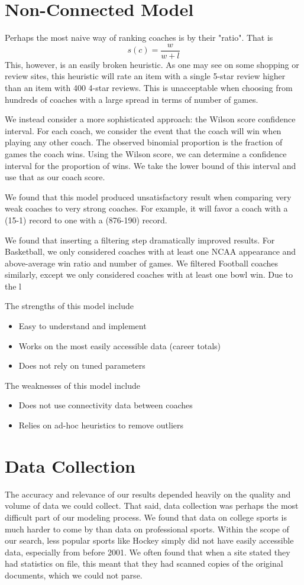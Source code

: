 \documentclass[12pt]{article}
\begin{document}
\section{Non-Connected Model}
Perhaps the most naive way of ranking coaches is by their "ratio". That is
\[s(c) = \frac{w}{w + l}\] 
This, however, is an easily broken heuristic. As one may see on some shopping or review sites, this heuristic will rate an item with a single 5-star review higher than an item with 400 4-star reviews. This is unacceptable when choosing from hundreds of coaches with a large spread in terms of number of games. 

We instead consider a more sophisticated approach: the Wilson score confidence interval. For each coach, we consider the event that the coach will win when playing any other coach. The observed binomial proportion is the fraction of games the coach wins. Using the Wilson score, we can determine a confidence interval for the proportion of wins. We take the lower bound of this interval and use that as our coach score.

We found that this model produced unsatisfactory result when comparing very weak coaches to very strong coaches. For example, it will favor a coach with a (15-1) record to one with a (876-190) record.

We found that inserting a filtering step dramatically improved results. For Basketball, we only considered coaches with at least one NCAA appearance and above-average win ratio and number of games. We filtered Football coaches similarly, except we only considered coaches with at least one bowl win. Due to the l

The strengths of this model include 
\begin{itemize}
\item Easy to understand and implement
\item Works on the most easily accessible data (career totals)
\item Does not rely on tuned parameters
\end{itemize}

The weaknesses of this model include
\begin{itemize}
\item Does not use connectivity data between coaches
\item Relies on ad-hoc heuristics to remove outliers
\end{itemize}



\section{Data Collection}
The accuracy and relevance of our results depended heavily on the quality and volume of data we could collect. That said, data collection was perhaps the most difficult part of our modeling process. We found that data on college sports is much harder to come by than data on professional sports. Within the scope of our search, less popular sports like Hockey simply did not have easily accessible data, especially from before 2001. We often found that when a site stated they had statistics on file, this meant that they had scanned copies of the original documents, which we could not parse.
\end{document}
